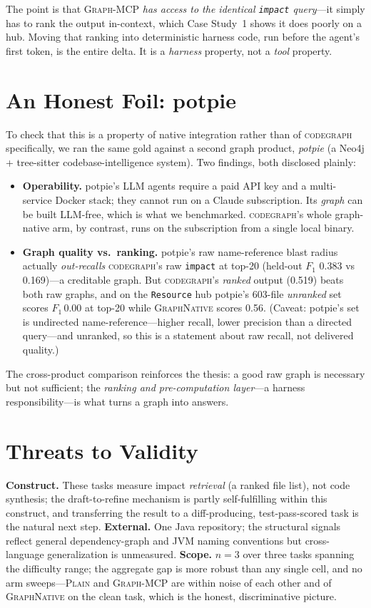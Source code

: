 \documentclass[11pt,twocolumn]{article}
\newcommand{\gn}{{\normalfont\scshape GraphNative}}
\newcommand{\mcp}{{\normalfont\scshape Graph-MCP}}
\newcommand{\plain}{{\normalfont\scshape Plain}}
\begin{document}
The point is that \mcp{} \emph{has access to the identical \texttt{impact} query}---it simply has to
rank the output in-context, which Case Study~1 shows it does poorly on a hub. Moving that ranking
into deterministic harness code, run before the agent's first token, is the entire delta. It is a
\emph{harness} property, not a \emph{tool} property.

\section{An Honest Foil: potpie}

To check that this is a property of native integration rather than of \textsc{codegraph}
specifically, we ran the same gold against a second graph product, \emph{potpie} (a Neo4j +
tree-sitter codebase-intelligence system). Two findings, both disclosed plainly:
\begin{itemize}
  \item \textbf{Operability.} potpie's LLM agents require a paid API key and a multi-service Docker
  stack; they cannot run on a Claude subscription. Its \emph{graph} can be built LLM-free, which is
  what we benchmarked. \textsc{codegraph}'s whole graph-native arm, by contrast, runs on the
  subscription from a single local binary.
  \item \textbf{Graph quality vs.\ ranking.} potpie's raw name-reference blast radius actually
  \emph{out-recalls} \textsc{codegraph}'s raw \texttt{impact} at top-20 (held-out $F_1$ 0.383 vs
  0.169)---a creditable graph. But \textsc{codegraph}'s \emph{ranked} output (0.519) beats both raw
  graphs, and on the \texttt{Resource} hub potpie's 603-file \emph{unranked} set scores $F_1\,0.00$
  at top-20 while \gn{} scores 0.56. (Caveat: potpie's set is undirected name-reference---higher
  recall, lower precision than a directed query---and unranked, so this is a statement about raw
  recall, not delivered quality.)
\end{itemize}
The cross-product comparison reinforces the thesis: a good raw graph is necessary but not
sufficient; the \emph{ranking and pre-computation layer}---a harness responsibility---is what turns a
graph into answers.

\section{Threats to Validity}
\textbf{Construct.} These tasks measure impact \emph{retrieval} (a ranked file list), not code
synthesis; the draft-to-refine mechanism is partly self-fulfilling within this construct, and
transferring the result to a diff-producing, test-pass-scored task is the natural next step.
\textbf{External.} One Java repository; the structural signals reflect general dependency-graph and
JVM naming conventions but cross-language generalization is unmeasured. \textbf{Scope.} $n{=}3$ over
three tasks spanning the difficulty range; the aggregate gap is more robust than any single cell, and
no arm sweeps---\plain{} and \mcp{} are within noise of each other and of \gn{} on the clean task,
which is the honest, discriminative picture.
\end{document}
